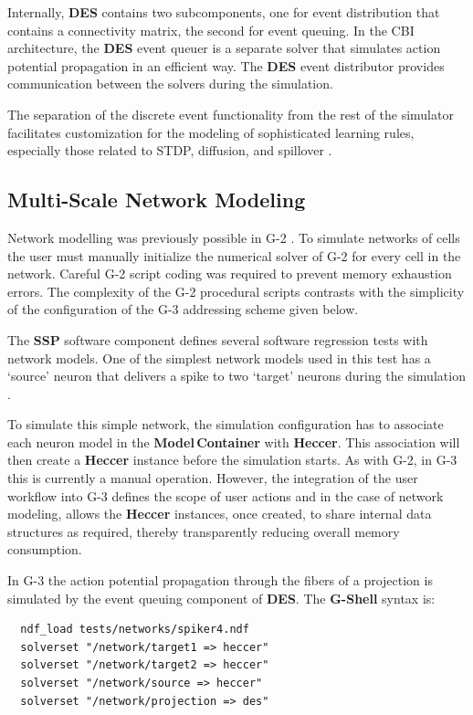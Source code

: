 \documentclass{article}
\begin{document}
Internally, {\bf DES} contains two subcomponents, one for event
distribution that contains a connectivity matrix, the second for event
queuing.  In the CBI architecture, the {\bf DES} event queuer is a
separate solver that simulates action potential propagation in an
efficient way.  The {\bf DES} event distributor provides communication
between the solvers during the simulation.

The separation of the discrete event functionality from the rest of
the simulator facilitates customization for the modeling of
sophisticated learning rules, especially those related to STDP,
diffusion, and spillover \cite{roberts02:_spike, nowotny03:_enhan}.

\subsection{Multi-Scale Network Modeling}

Network modelling was previously possible in
G-2 \cite{cornelis02:_tutor}.  To simulate networks of cells the user
must manually initialize the numerical solver of G-2 for
every cell in the network.  Careful G-2 script coding was required to
prevent memory exhaustion errors.  The complexity of the G-2 procedural scripts contrasts with the simplicity of the configuration of the G-3 addressing scheme given below.

The {\bf SSP} software component defines several software regression
tests with network models.  One of the simplest network models used in
this test has a `source' neuron that delivers a spike to two
`target' neurons during the simulation .

To simulate this simple network, the simulation configuration has to
associate each neuron model in the {\bf Model\,Container} with {\bf
  Heccer}.  This association will then create a {\bf Heccer} instance
before the simulation starts.  As with G-2, in G-3 this is currently a manual
operation.
However, the integration of the user workflow into G-3 defines
the scope of user actions and in the case of network modeling, allows
the {\bf Heccer} instances, once created, to share internal data
structures as required, thereby transparently reducing overall memory consumption.

In G-3 the action potential propagation through the fibers of a
projection is simulated by the event queuing component of {\bf DES}.
The {\bf G-Shell} syntax is:
\begin{verbatim}
  ndf_load tests/networks/spiker4.ndf
  solverset "/network/target1 => heccer"
  solverset "/network/target2 => heccer"
  solverset "/network/source => heccer"
  solverset "/network/projection => des"
\end{verbatim}
\end{document}
